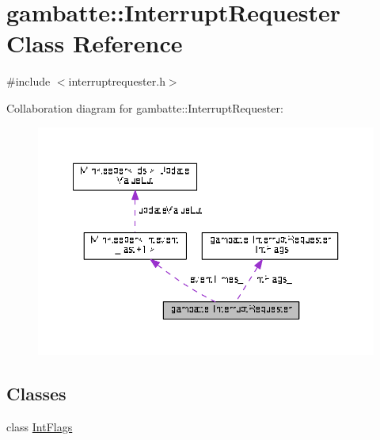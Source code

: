 \hypertarget{classgambatte_1_1InterruptRequester}{}\section{gambatte\+:\+:Interrupt\+Requester Class Reference}
\label{classgambatte_1_1InterruptRequester}


{\ttfamily \#include $<$interruptrequester.\+h$>$}



Collaboration diagram for gambatte\+:\+:Interrupt\+Requester\+:
\nopagebreak
\begin{figure}[H]
\begin{center}
\leavevmode
\includegraphics[width=350pt]{classgambatte_1_1InterruptRequester__coll__graph}
\end{center}
\end{figure}
\subsection*{Classes}
\begin{DoxyCompactItemize}
\item 
class \hyperlink{classgambatte_1_1InterruptRequester_1_1IntFlags}{Int\+Flags}
\end{DoxyCompactItemize}
